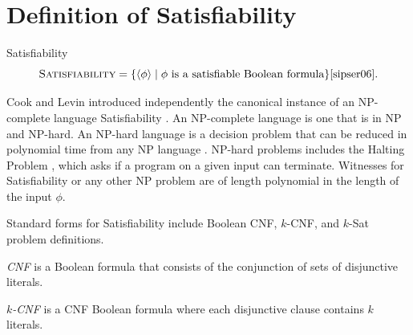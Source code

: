 
	
\section{Definition of {\sc Satisfiability}}

	

\begin{definition}
{\sc Satisfiability}\\
\[
\text{\sc Satisfiability} = \{ \langle \phi \rangle \mid \phi \text{ is a satisfiable Boolean formula}\} \cite{sipser06}.
\]	
\end{definition}

Cook and Levin introduced independently the canonical instance of an \textsf{NP-complete} language {\sc Satisfiability} \cite{Cook:1971:CTP:800157.805047, levin1973}.  An \textsf{NP-complete} language is one that is in \textsf{NP} and \textsf{NP-hard}.  An \textsf{NP-hard} language is a decision problem that can be reduced in polynomial time from any \textsf{NP} language \cite{sipser06}.  \textsf{NP-hard} problems includes the {\sc Halting Problem} \cite{sipser06}, which asks if a program on a given input can terminate.  Witnesses for {\sc Satisfiability} or any other \textsf{NP} problem are of length polynomial in the length of the input $\phi$.

Standard forms for {\sc Satisfiability} include Boolean CNF, $k$-CNF, and $k$-{\sc Sat} problem definitions.

\begin{definition}
\emph{CNF} is a Boolean formula that consists of the conjunction of sets of disjunctive literals.
\end{definition}

\begin{definition}
\emph{$k$-CNF} is a CNF Boolean formula where each disjunctive clause contains $k$ literals.
\end{definition}

